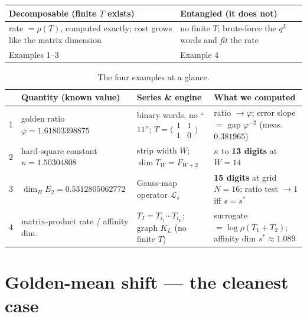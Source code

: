 \documentclass[11pt]{article}
\newcommand{\spec}{\rho}                 %
\begin{document}
\begin{center}
\renewcommand{\arraystretch}{1.2}
\begin{tabular}{@{}p{}p{}@{}}
\toprule
\textbf{Decomposable} (finite $T$ exists) & \textbf{Entangled} (it does not)\\
\midrule
rate $=\spec(T)$, computed exactly; cost grows like the matrix dimension
& no finite $T$; brute-force the $q^L$ words and \emph{fit} the rate\\
Examples 1--3 & Example 4\\
\bottomrule
\end{tabular}
\end{center}

\begin{table}[h]
\centering
\renewcommand{\arraystretch}{1.35}
\small
\begin{tabular}{@{}p{0.5cm}p{3.3cm}p{4.4cm}p{4.6cm}@{}}
\toprule
 & \textbf{Quantity (known value)} & \textbf{Series \& engine} & \textbf{What we computed}\\
\midrule
1 & golden ratio $\varphi=1.61803398875$
  & binary words, no ``$11$''; $T=\bigl(\begin{smallmatrix}1&1\\1&0\end{smallmatrix}\bigr)$
  & ratio $\to\varphi$; error slope $=$ gap $\varphi^{-2}$ (meas.\ $0.381965$)\\
2 & hard-square constant $\kappa=1.50304808$
  & strip width $W$; $\dim T_W=F_{W+2}$
  & $\kappa$ to \textbf{13 digits} at $W=14$\\
3 & $\dim_H E_2=0.5312805062772$
  & Gauss-map operator $\mathcal L_s$
  & \textbf{15 digits} at grid $N=16$; ratio test $\to1$ iff $s=s^\ast$\\
4 & matrix-product rate / affinity dim.
  & $T_I=T_{i_1}\!\cdots T_{i_L}$; graph $K_L$ (no finite $T$)
  & surrogate $=\log\spec(T_1{+}T_2)$; affinity dim $s^\ast\!\approx\!1.089$\\
\bottomrule
\end{tabular}
\caption{The four examples at a glance.}
\label{tab:summary}
\end{table}

\section{Golden-mean shift --- the cleanest case}
\end{document}
